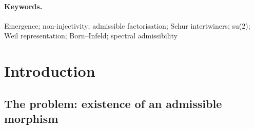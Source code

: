 \documentclass[11pt,a4paper]{article}
\theoremstyle{remark}
\begin{document}
  \paragraph{Keywords.}
    Emergence; non-injectivity; admissible factorisation; Schur intertwiners; su(2);
    Weil representation; Born–Infeld; spectral admissibility

    \clearpage
    \tableofcontents

    \clearpage
  \section{Introduction}

  \subsection{The problem: existence of an admissible morphism}
\end{document}
